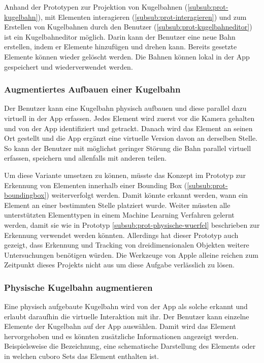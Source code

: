 Anhand der Prototypen zur Projektion von Kugelbahnen (\ref{subsub:prot-kugelbahn}), mit Elementen interagieren (\ref{subsub:prot-interagieren}) und zum Erstellen von Kugelbahnen durch den Benutzer (\ref{subsub:prot-kugelbahneditor}) ist ein Kugelbahneditor möglich.
Darin kann der Benutzer eine neue Bahn erstellen, indem er Elemente hinzufügen und drehen kann.
Bereits gesetzte Elemente können wieder gelöscht werden.
Die Bahnen können lokal in der App gespeichert und wiederverwendet werden.

\subsubsection{Augmentiertes Aufbauen einer Kugelbahn}\label{subsub:loesung-augmentiertes-aufbauen}

Der Benutzer kann eine Kugelbahn physisch aufbauen und diese parallel dazu virtuell in der App erfassen.
Jedes Element wird zuerst vor die Kamera gehalten und von der App identifiziert und getrackt.
Danach wird das Element an seinen Ort gestellt und die App ergänzt eine virtuelle Version davon an derselben Stelle.
So kann der Benutzer mit möglichst geringer Störung die Bahn parallel virtuell erfassen, speichern und allenfalls mit anderen teilen.

Um diese Variante umsetzen zu können, müsste das Konzept im Prototyp zur Erkennung von Elementen innerhalb einer Bounding Box (\ref{subsub:prot-boundingbox}) weiterverfolgt werden.
Damit könnte erkannt werden, wann ein Element an einer bestimmten Stelle platziert wurde.
Weiter müssten alle unterstützten Elementtypen in einem Machine Learning Verfahren gelernt werden, damit sie wie in Prototyp \ref{subsub:prot-physische-wuerfel} beschrieben zur Erkennung verwendet werden könnten.
Allerdings hat dieser Prototyp auch gezeigt, dass Erkennung und Tracking von dreidimensionalen Objekten weitere Untersuchungen benötigen würden.
Die Werkzeuge von Apple alleine reichen zum Zeitpunkt dieses Projekts nicht aus um diese Aufgabe verlässlich zu lösen.

\subsubsection{Physische Kugelbahn augmentieren}

Eine physisch aufgebaute Kugelbahn wird von der App als solche erkannt und erlaubt daraufhin die virtuelle Interaktion mit ihr.
Der Benutzer kann einzelne Elemente der Kugelbahn auf der App auswählen.
Damit wird das Element hervorgehoben und es könnten zusätzliche Informationen angezeigt werden.
Beispielsweise die Bezeichnung, eine schematische Darstellung des Elements oder in welchen cuboro Sets das Element enthalten ist.

